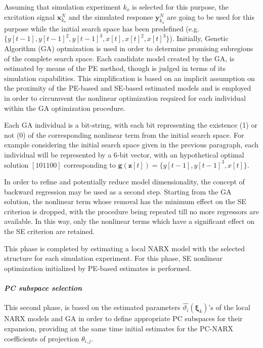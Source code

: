 \documentclass[preprint,3p,review,times,11pt]{elsarticle}
\newcommand{\bld}[1]{\boldsymbol{#1}}
\newcommand{\bxi}{\bld{\xi}}
\begin{document}
Assuming that simulation experiment $k_o$ is selected for this purpose, the excitation signal $\bld{x}_{k_o}^N$ and the simulated response $\bld{y}_{k_o}^N$  are going to be used for this purpose while the initial search space has been predefined (e.g. $\{ y[t-1], y[t-1]^2 , y[t-1]^3, x[t],x[t]^2,x[t]^3 \}$). Initially, Genetic Algorithm (GA) optmization is used in order to determine promising subregions of the complete search space. Each candidate model created by the GA, is estimated by means of the PE method, though is judged in terms of its simulation capabilities. This simplification is based on an implicit assumption on the proximity of the PE-based and SE-based estimated models and is employed in order to circumvent the nonlinear optimization required for each individual within the GA optimization procedure. 

Each GA individual is a bit-string, with each bit representing the existence (1) or not (0) of the corresponding nonlinear term from the initial search space. For example considering the initial search space given in the previous paragraph, each individual will be represented by a 6-bit vector, with an hypothetical optimal solution $[1 0 1 1 0 0]$ corresponding to ${\bld g}({\bld z}[t]) = \{ y[t-1], y[t-1]^3, x[t] \}$.          

In order to refine and potentially reduce model dimensionality, the concept of backward regression may be used as a second step. Starting from the GA solution, the nonlinear term whose removal has the minimum effect on the SE criterion is dropped, with the procedure being repeated till no more regressors are available. In this way, only the nonlinear terms which have a significant effect on the SE criterion are retained. 

This phase is completed by estimating a local NARX model with the selected structure for each simulation experiment. For this phase, SE nonlinear optimization initialized by PE-based estimates is performed. 


\paragraph{\bf \em PC subspace selection}

This second phase, is based on the estimated parameters $\hat{\vartheta_i} (\bxi_k)$'s of the local NARX models and GA in order to define appropriate PC subspaces for their expansion, providing at the same time initial estimates for the PC-NARX coefficients of projection $\theta_{i,j}$.   
\end{document}
